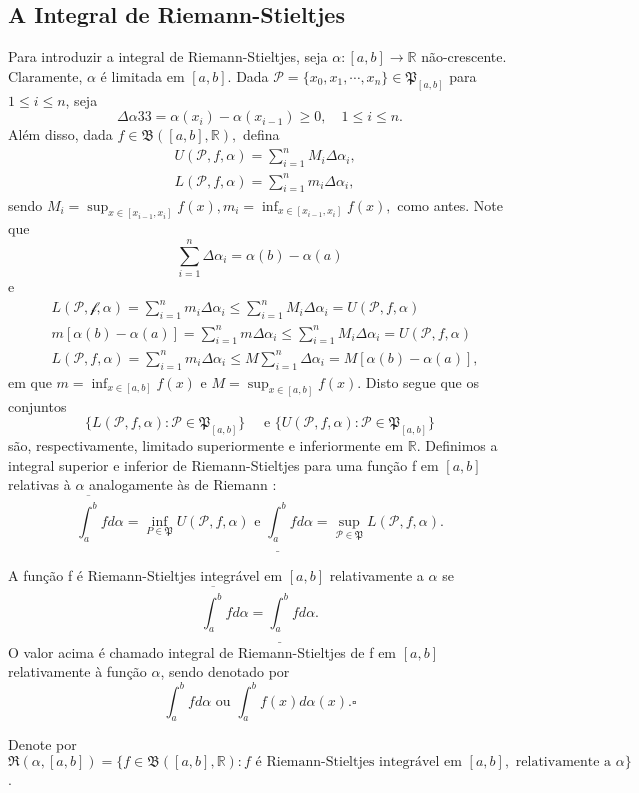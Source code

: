 \documentclass[analysis_notes.tex]{subfiles}
\begin{document}
\subsection{A Integral de Riemann-Stieltjes}
Para introduzir a integral de Riemann-Stieltjes, seja \(\alpha :[a, b]\rightarrow \mathbb{R}\) não-crescente. Claramente, \(\alpha \) é limitada em \([a, b]\).
Dada \(\mathcal{P}=\{x_{0}, x_{1}, \cdots, x_{n}\}\in \mathfrak{P}_{[a, b]}\) para \(1\leq i\leq n\), seja
\[
	\Delta \alpha 33 = \alpha (x_{i}) - \alpha (x_{i-1})\geq 0,\quad 1\leq i\leq n.
\]
Além disso, dada \(f\in \mathfrak{B}([a, b], \mathbb{R}),\) defina
\begin{align*}
	 & U(\mathcal{P}, f, \alpha ) = \sum\limits_{i=1}^{n}M_{i}\Delta \alpha_{i}, \\
	 & L(\mathcal{P}, f, \alpha ) = \sum\limits_{i=1}^{n}m_{i}\Delta \alpha_{i},
\end{align*}
sendo \(M_{i} = \sup_{x\in[x_{i-1}, x_{i}]}f(x), m_{i} = \inf_{x\in[x_{i-1}, x_{i}]}f(x),\) como antes.
Note que
\[
	\sum\limits_{i=1}^{n}\Delta \alpha_{i} = \alpha (b) - \alpha (a)
\]
e
\begin{align*}
	 & L(\mathcal{P, f, \alpha }) = \sum\limits_{i=1}^{n}m_{i}\Delta \alpha_{i}\leq \sum\limits_{i=1}^{n}M_{i}\Delta \alpha_{i} = U(\mathcal{P}, f, \alpha ) \\
	 & m[\alpha (b) - \alpha (a)] = \sum\limits_{i=1}^{n}m\Delta \alpha_{i}\leq \sum\limits_{i=1}^{n}M_{i}\Delta \alpha_{i} = U(\mathcal{P}, f, \alpha )     \\
	 & L(\mathcal{P}, f, \alpha ) = \sum\limits_{i=1}^{n}m_{i}\Delta \alpha_{i}\leq M \sum\limits_{i=1}^{n}\Delta \alpha_{i} = M[\alpha (b)-\alpha (a)],
\end{align*}
em que \(m = \inf_{x\in[a,b]}f(x)\) e \(M=\sup_{x\in[a, b]}f(x).\) Disto segue que os conjuntos
\[
	\{L(\mathcal{P}, f, \alpha ): \mathcal{P}\in \mathfrak{P}_{[a, b]}\}\quad\text{ e } \{U(\mathcal{P}, f, \alpha ): \mathcal{P}\in \mathfrak{P}_{[a, b]}\}
\]
são, respectivamente, limitado superiormente e inferiormente em \(\mathbb{R}.\) Definimos a integral superior
e inferior de Riemann-Stieltjes para uma fun\c cão f em \([a, b]\) relativas à \(\alpha \) analogamente às de Riemann :
\[
	\overline{\int_{a}^{b}}f d\alpha =\inf_{P\in \mathfrak{P}}U(\mathcal{P}, f, \alpha ) \text{ e } \underline{\int_{a}^{b}}f d\alpha =\sup_{\mathcal{P}\in \mathfrak{P}}L(\mathcal{P}, f, \alpha ).
\]
\begin{def*}
	A fun\c cão f é Riemann-Stieltjes integrável em \([a, b]\) relativamente a \(\alpha \) se
	\[
		\overline{\int_{a}^{b}}f d\alpha  = \underline{\int_{a}^{b}}fd\alpha .
	\]
	O valor acima é chamado integral de Riemann-Stieltjes de f em \([a, b]\) relativamente à fun\c cão \(\alpha \), sendo denotado por
	\[
		\int_{a}^{b} f d\alpha \text{ ou } \int_{a}^{b} f(x) d\alpha (x). \square
	\]
\end{def*}
Denote por \(\mathfrak{R}(\alpha , [a, b]) = \{f\in \mathfrak{B}([a, b], \mathbb{R}): f\text{ é Riemann-Stieltjes integrável em }[a, b],\text{ relativamente a }\alpha \}\).
\end{document}
